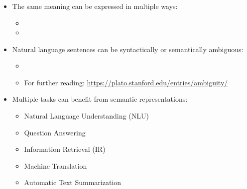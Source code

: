 \documentclass[xcolor=table]{beamer}
\begin{document}
\begin{frame}
	\frametitle{\insertshortsubtitle}
	\framesubtitle{\insertsection}
	
	\begin{itemize}
		\item The same meaning can be expressed in multiple ways:
		\begin{itemize}
			\item {}
			\item {}
		\end{itemize}
		
		\item Natural language sentences can be syntactically or semantically ambiguous:
		\begin{itemize}
			\item {}
			\item For further reading: \url{https://plato.stanford.edu/entries/ambiguity/}
		\end{itemize}
		
		\item Multiple tasks can benefit from semantic representations:
		\begin{itemize}
			\item Natural Language Understanding (NLU)
			\item Question Answering
			\item Information Retrieval (IR)
			\item Machine Translation
			\item Automatic Text Summarization
		\end{itemize}
	\end{itemize}
	
\end{frame}
\end{document}
